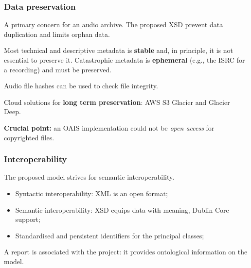 \documentclass{beamer}
\newcommand\rb[1]{\textcolor{ThemeRed}{\textbf{#1}}}
\begin{document}
  \begin{frame}
    \frametitle{Data preservation}

    A primary concern for an audio archive. The proposed XSD prevent data duplication and limits orphan data.

    \vspace{1em}

    Most technical and descriptive metadata is \rb{stable} and, in principle, it is not essential to preserve it. Catastrophic metadata is \rb{ephemeral} (e.g., the ISRC for a recording) and must be preserved.

    \vspace{1em}

    Audio file hashes can be used to check file integrity.

    \vspace{1em}

    Cloud solutions for \rb{long term preservation}: AWS S3 Glacier and Glacier Deep.
    
    \vspace{1em}

    \rb{Crucial point:} an OAIS implementation could not be \textit{open access} for copyrighted files.

  \end{frame}


  
  \begin{frame}
    \frametitle{Interoperability}

    The proposed model strives for semantic interoperability.

    \vspace{1em}

    \begin{itemize}
      \itemsep0.5em
      \item Syntactic interoperability: XML is an open format;
      \item Semantic interoperability: XSD equips data with meaning, Dublin Core support;
      \item Standardised and persistent identifiers for the principal classes;
    \end{itemize}

    \vspace{1em}

    A report is associated with the project: it provides ontological information on the model.
  \end{frame}

  
\end{document}
